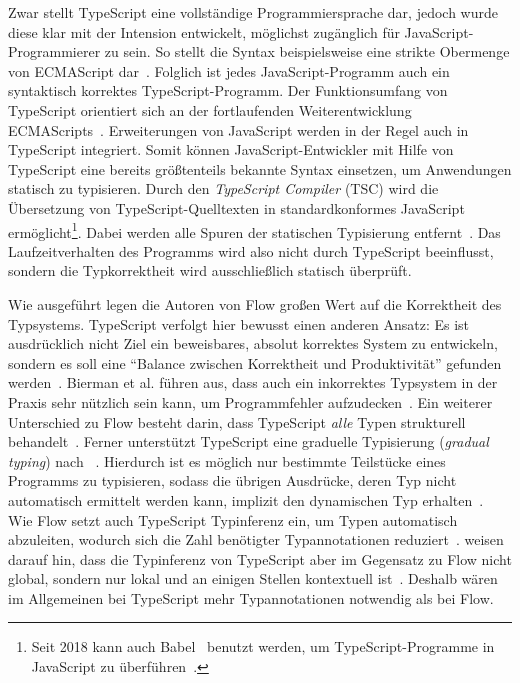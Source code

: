 Zwar stellt TypeScript eine vollständige Programmiersprache dar, jedoch wurde diese klar mit der Intension entwickelt, möglichst zugänglich für JavaScript-Programmierer zu sein. So stellt die Syntax beispielsweise eine strikte Obermenge von ECMAScript dar~\autocite[25]{FLOW:PAPER}. Folglich ist jedes JavaScript-Programm auch ein syntaktisch korrektes TypeScript-Programm. Der Funktionsumfang von TypeScript orientiert sich an der fortlaufenden Weiterentwicklung ECMAScripts~\autocite[1]{BIERMAN:2014}. Erweiterungen von JavaScript werden in der Regel auch in TypeScript integriert. Somit können JavaScript-Entwickler mit Hilfe von TypeScript eine bereits größtenteils bekannte Syntax einsetzen, um Anwendungen statisch zu typisieren. Durch den \textit{TypeScript Compiler} (TSC) wird die Übersetzung von TypeScript-Quelltexten in standardkonformes JavaScript ermöglicht\footnote{Seit 2018 kann auch Babel~\autocite{BABEL} benutzt werden, um TypeScript-Programme in JavaScript zu überführen~\autocite{TYPESCRIPT:BABEL}.}. Dabei werden alle Spuren der statischen Typisierung entfernt~\autocite[3]{BIERMAN:2014}. Das Laufzeitverhalten des Programms wird also nicht durch TypeScript beeinflusst, sondern die Typkorrektheit wird ausschließlich statisch überprüft.

Wie ausgeführt legen die Autoren von Flow großen Wert auf die Korrektheit des Typsystems. TypeScript verfolgt hier bewusst einen anderen Ansatz: Es ist ausdrücklich nicht Ziel ein beweisbares, absolut korrektes System zu entwickeln, sondern es soll eine \enquote{Balance zwischen Korrektheit und Produktivität} gefunden werden~\autocite{TYPESCRIPT:DESIGN_GOALS}. Bierman et al. führen aus, dass auch ein inkorrektes Typsystem in der Praxis sehr nützlich sein kann, um Programmfehler aufzudecken~\autocite[3]{BIERMAN:2014}. Ein weiterer Unterschied zu Flow besteht darin, dass TypeScript \emph{alle} Typen strukturell behandelt~\autocite[38]{TYPESCRIPT:SPEC}.
Ferner unterstützt TypeScript eine graduelle Typisierung (\textit{gradual typing}) nach \citeauthor{SIEK:2007}~\autocite{SIEK:2007}. Hierdurch ist es möglich nur bestimmte Teilstücke eines Programms zu typisieren, sodass die übrigen Ausdrücke, deren Typ nicht automatisch ermittelt werden kann, implizit den dynamischen Typ  erhalten~\autocite{TYPESCRIPT:DESIGN_GOALS}. Wie Flow setzt auch TypeScript Typinferenz ein, um Typen automatisch abzuleiten, wodurch sich die Zahl benötigter Typannotationen reduziert~\autocite[4]{BIERMAN:2014}. \citeauthor{FLOW:PAPER} weisen darauf hin, dass die Typinferenz von TypeScript aber im Gegensatz zu Flow nicht global, sondern nur lokal und an einigen Stellen kontextuell ist~\autocite[24]{FLOW:PAPER}. Deshalb wären im Allgemeinen bei TypeScript mehr Typannotationen notwendig als bei Flow.

